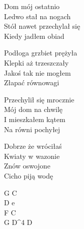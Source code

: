 \begin{text}
    Dom mój ostatnio\\
    Ledwo stał na nogach\\
    Stół nawet przechylał się\\
    Kiedy jadłem obiad

    Podłoga grzbiet prężyła\\
    Klepki aż trzeszczały\\
    Jakoś tak nie mogłem\\
    Złapać równowagi

    Przechylił się mrocznie\\
    Mój dom na chwilę\\
    I mieszkałem kątem\\
    Na równi pochyłej

    Dobrze że wróciłaś\\
    Kwiaty w wazonie\\
    Znów oswojone\\
    Cicho piją wodę
\end{text}
\begin{chord}
    G C\\
    D e\\
    F C\\
    G D^{4} D
\end{chord}